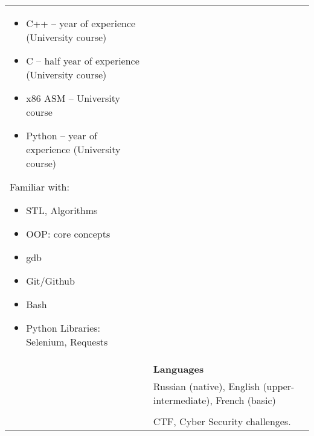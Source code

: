 \documentclass[letterpaper, 11pt]{article}
\begin{document}
\begin{longtable}{p{1.3in}p{4.8in}}
\begin{itemize}[noitemsep, leftmargin=*]
    \item C++ -- year of experience (University course)
    \item C -- half year of experience (University course)
    \item x86 ASM -- University course
    \item Python -- year of experience (University course)
\end{itemize}
Familiar with: 
\begin{itemize}[noitemsep, leftmargin=*]
    \item STL, Algorithms
    \item OOP: core concepts
    \item gdb
    \item Git/Github
    \item Bash
    \item Python Libraries: Selenium, Requests

\end{itemize}
\\
& \textbf{Languages} \\
& Russian (native), English (upper-intermediate), French (basic) \\
& \\




\nohyphens{\color{OliveGreen}{Other interests}} & CTF, Cyber Security challenges.\\


\end{longtable}
\end{document}
